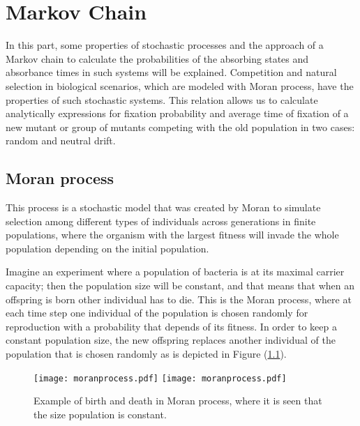 \renewcommand{\chaptername}{}
\chapter{Markov Chain }
\ifpdf
    \graphicspath{{MarkovChain/Chapter3Figs/PNG/}{MarkovChain/Chapter3Figs/PDF/}{MarkovChain/Chapter3Figs/}}
\else
    \graphicspath{{MarkovChain/Chapter3Figs/EPS/}{MarkovChain/Chapter3Figs/}}
\fi
{}
In this part, some properties of stochastic processes and the approach of a Markov chain to calculate the probabilities of the absorbing states  and absorbance times in such systems will be explained. Competition and natural selection in biological scenarios, which are modeled with Moran process, have the properties of such stochastic systems. This relation allows us to calculate analytically expressions for fixation probability and average time of fixation of a new mutant or group of mutants competing with the old population in two cases: random and neutral drift.  
  
 

\section{ Moran process}
This process is a stochastic model that was created by Moran to simulate selection among different types of individuals across generations in finite populations, where the organism with the largest fitness will invade the whole population depending on the initial population.   


Imagine an experiment where a population of bacteria is at its maximal carrier capacity; then the population size will be constant, and that means that when an offspring is born other individual has to die. 
This is the Moran process, where at each time step one individual of the population is chosen randomly for reproduction with a probability that depends of its fitness. In order to keep a constant population size, the new offspring replaces another individual of the population that is chosen randomly as is depicted in Figure (\ref{Fig41}). 

\begin{figure}[H]
  \begin{center}
    \leavevmode
    \ifpdf
      \texttt{[image: moranprocess.pdf]}
    \else
      \texttt{[image: moranprocess.pdf]}
    \fi
    \caption{Example of birth and death in Moran process, where it is seen that the size population is constant.}
    \label{Fig41}
  \end{center}
  \end{figure}

